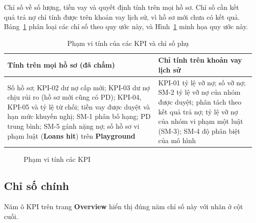 Chỉ số về số lượng, tiền vay và quyết định tính trên mọi hồ sơ. Chỉ số cần kết quả trả nợ chỉ tính được trên khoản vay lịch sử, vì hồ sơ mới chưa có kết quả. Bảng~\ref{tab:kpi-scope} phân loại các chỉ số theo quy ước này, và Hình~\ref{fig:kpi_scope} minh họa quy ước này.

\begin{table}[H]
	\centering
	\caption{Phạm vi tính của các KPI và chỉ số phụ}
	\label{tab:kpi-scope}
	\footnotesize
	\begin{tabular}{p{8cm} p{8cm}}
		\toprule
		\textbf{Tính trên mọi hồ sơ (đã chấm)} & \textbf{Chỉ tính trên khoản vay lịch sử}                                                                                                                                       \\
		\midrule
		Số hồ sơ; KPI-02 dư nợ cấp mới; KPI-03 dư nợ chịu rủi ro (hồ sơ mới cũng có PD); KPI-04, KPI-05 và tỷ lệ từ chối; tiền vay được duyệt và hạn mức khuyến nghị; SM-1 phân bố hạng; PD trung bình; SM-5 gánh nặng nợ; số hồ sơ vi phạm luật (\textbf{Loans hit}) trên \textbf{Playground}
		                                       & KPI-01 tỷ lệ vỡ nợ; số vỡ nợ; SM-2 tỷ lệ vỡ nợ của nhóm được duyệt; phân tách theo kết quả trả nợ; tỷ lệ vỡ nợ của nhóm vi phạm một luật (SM-3); SM-4 độ phân biệt của mô hình \\
		\bottomrule
	\end{tabular}
\end{table}

\begin{figure}[H]
	\centering
	\caption{Phạm vi tính các KPI}
	\label{fig:kpi_scope}
\end{figure}

\subsection{Chỉ số chính}
\label{sec:kpi-main}
Năm ô KPI trên trang \textbf{Overview} hiển thị đúng năm chỉ số này với nhãn ở cột cuối.

